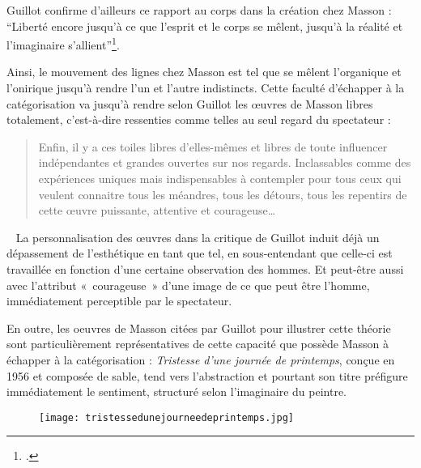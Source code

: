 	
	 Guillot confirme d’ailleurs ce rapport au corps dans la création chez Masson : \enquote{Liberté encore jusqu’à ce que l’esprit et le corps se mêlent, jusqu’à la réalité et l’imaginaire s’allient}\footcite{massonlyon}. 

	Ainsi, le mouvement des lignes chez Masson est tel que se mêlent l’organique et l’onirique jusqu’à rendre l’un et l’autre indistincts. Cette faculté d’échapper à la catégorisation va jusqu’à rendre selon Guillot les \oe{}uvres de Masson libres totalement, c’est-à-dire ressenties comme telles au seul regard du spectateur : 

	\begin{quote}
	Enfin, il y a ces toiles libres d’elles-mêmes et libres de toute influencer indépendantes et grandes ouvertes sur nos regards. Inclassables comme des expériences  uniques mais indispensables à contempler pour tous ceux qui veulent connaitre tous les méandres, tous les détours, tous les repentirs de cette \oe{}uvre puissante, attentive et courageuse… 	
	\end{quote}
 
	 La personnalisation des \oe{}uvres dans la critique de Guillot induit déjà un dépassement de l’esthétique en tant que tel, en sous-entendant que celle-ci est travaillée en fonction d’une certaine observation des hommes. Et peut-être aussi avec l’attribut « courageuse » d’une image de ce que peut être l’homme, immédiatement perceptible par le spectateur.  

En outre, les oeuvres de Masson citées par Guillot pour illustrer cette théorie sont particulièrement représentatives de cette capacité que possède Masson à échapper à la catégorisation : \emph{Tristesse d’une journée de printemps}, conçue en 1956 et composée de sable, tend vers l’abstraction et pourtant son titre préfigure immédiatement le sentiment, structuré selon l’imaginaire du peintre. 


\begin{figure}[H]
   \centering
   \texttt{[image: tristessedunejourneedeprintemps.jpg]}
	\caption{\cite{tristesse}}\label{fig:Tristessedunejourneedeprintemps}
\end{figure}

